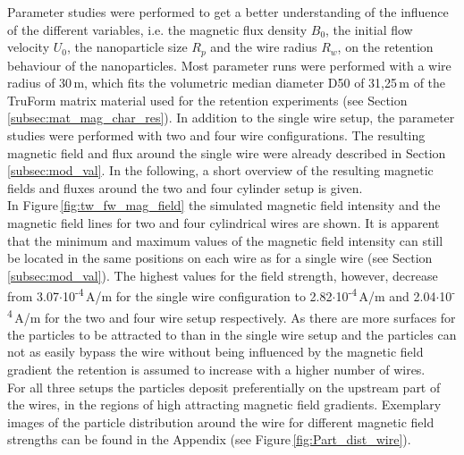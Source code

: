 Parameter studies were performed to get a better understanding of the influence of the different variables, i.e. the magnetic flux density $B_{0}$, the initial flow velocity $U_{0}$, the nanoparticle size $R_{p}$ and the wire radius $R_{w}$, on the retention behaviour of the nanoparticles.
Most parameter runs were performed with a wire radius of 30\,\textmu m, which fits the volumetric median diameter D50 of 31,25\,\textmu m of the TruForm matrix material used for the retention experiments (see Section\,\ref{subsec:mat_mag_char_res}). In addition to the single wire setup, the parameter studies were performed with two and four wire configurations. The resulting magnetic field and flux around the single wire were already described in Section\,\ref{subsec:mod_val}. In the following, a short overview of the resulting  magnetic fields and fluxes around the two and four cylinder setup is given.\\
In Figure\,\ref{fig:tw_fw_mag_field} the simulated magnetic field intensity and the magnetic field lines for two and four cylindrical wires are shown. It is apparent that the minimum and maximum values of the magnetic field intensity can still be located in the same positions on each wire as for a single wire (see Section\,\ref{subsec:mod_val}). The highest values for the field strength, however, decrease from 3.07$\cdotp$10\textsuperscript{-4}\,A/m for the single wire configuration to 2.82$\cdotp$10\textsuperscript{-4}\,A/m and 2.04$\cdotp$10\textsuperscript{-4}\,A/m for the two and four wire setup respectively. As there are more surfaces for the particles to be attracted to than in the single wire setup and the particles can not as easily bypass the wire without being influenced by the magnetic field gradient the retention is assumed to increase with a higher number of wires.\\
For all three setups the particles deposit preferentially on the upstream part of the wires, in the regions of high attracting magnetic field gradients. Exemplary images of the particle distribution around the wire for different magnetic field strengths can be found in the Appendix (see Figure\,\ref{fig:Part_dist_wire}). 

